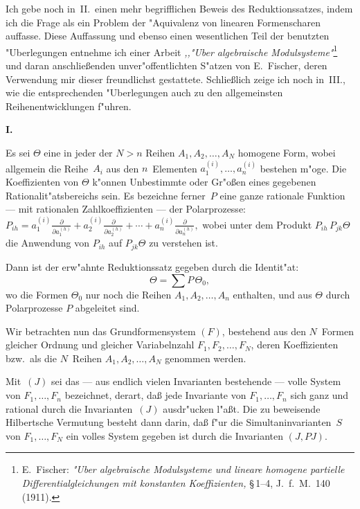 \documentclass[11pt,a4paper]{article}
\begin{document}
Ich gebe noch in~II.\ einen mehr begrifflichen Beweis des Reduktionssatzes,
indem ich die Frage als ein Problem der "{A}quivalenz von linearen
Formenscharen auffasse. Diese Auffassung und ebenso einen wesentlichen
Teil der benutzten "{U}berlegungen entnehme ich einer Arbeit \emph{,,"{U}ber algebraische
Modulsysteme"{}}\footnote{E.~Fischer: \emph{"{U}ber algebraische Modulsysteme und
lineare homogene partielle Differentialgleichungen mit konstanten Koeffizienten,}
\S\,1--4, J.\ f.\ M.\ 140 (1911).} und daran anschlie\ss{}enden unver"{o}ffentlichten
S"{a}tzen von E.~Fischer, deren Verwendung mir dieser freundlichst gestattete.
Schlie\ss{}lich zeige ich noch in~III., wie die entsprechenden "{U}berlegungen
auch zu den allgemeinsten Reihenentwicklungen f"{u}hren.

\medskip
\noindent
\textbf{I.}

Es sei $\Theta$ eine in jeder der $N>n$ Reihen $A_{1},A_{2},\dots,A_{N}$
homogene Form, wobei allgemein die Reihe~$A_{i}$ aus den $n$~Elementen
$a_{1}^{(i)},\dots,a_{n}^{(i)}$ bestehen m"{o}ge. Die Koeffizienten von $\Theta$ k"{o}nnen
Unbestimmte oder Gr"{o}\ss{}en eines gegebenen Rationalit"{a}tsbereichs sein.
Es bezeichne ferner~$P$ eine ganze rationale Funktion --- mit rationalen
Zahlkoeffizienten --- der Polarprozesse:
$P_{ih}=a_{1}^{(i)}\frac{\partial}{\partial a_{1}^{(h)}}+a_{2}^{(i)}\frac{\partial}{\partial a_{2}^{(h)}}+\cdots+a_{n}^{(i)}\frac{\partial}{\partial a_{n}^{(h)}},$
wobei unter dem Produkt $P_{ih}\,P_{jk}\Theta$ die Anwendung von $P_{ih}$ auf
$P_{jk}\Theta$ zu verstehen ist.

Dann ist der erw"{a}hnte Reduktionssatz gegeben durch die Identit"{a}t:
\begin{equation}
\Theta=\sum P\,\Theta_{0},\tag{1}
\end{equation}
wo die Formen $\Theta_{0}$ nur noch die Reihen $A_{1},A_{2},\dots,A_{n}$ enthalten,
und aus $\Theta$ durch Polarprozesse $P$ abgeleitet sind.

Wir betrachten nun das Grundformensystem $(F)$, bestehend aus den
$N$~Formen gleicher Ordnung und gleicher Variabelnzahl
$F_{1},F_{2},\dots,F_{N}$,
deren Koeffizienten bzw.\ als die $N$~Reihen $A_{1},A_{2},\dots,A_{N}$
genommen werden.

Mit~$(J)$ sei das --- aus endlich vielen Invarianten bestehende ---
volle System von $F_{1},\dots,F_{n}$ bezeichnet, derart, da\ss{} jede Invariante
von $F_{1},\dots,F_{n}$ sich ganz und rational durch die Invarianten~$(J)$
ausdr"{u}cken l"{a}\ss{}t. Die zu beweisende Hilbertsche Vermutung besteht dann
darin, da\ss{} f"{u}r die Simultaninvarianten~$S$ von $F_{1},\dots,F_{N}$ ein volles
System gegeben ist durch die Invarianten $(J,PJ)$.
\end{document}
